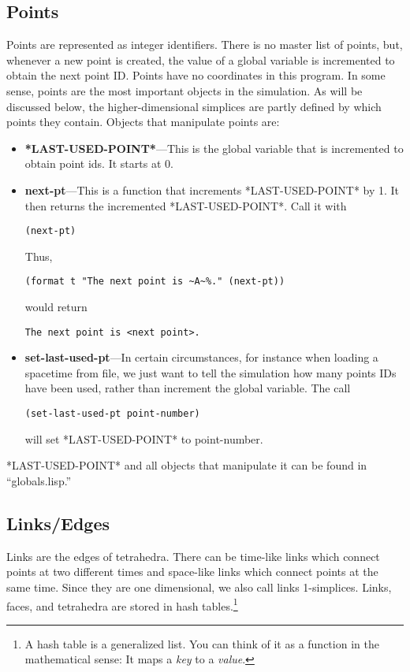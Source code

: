 \message{ !name(programmers_guide.tex)}\documentclass[12pt]{article}
\begin{document}
\subsection{Points}
\label{ss:points}

Points are represented as integer identifiers. There is no master list
of points, but, whenever a new point is created, the value of a global
variable is incremented to obtain the next point ID. Points have no
coordinates in this program. In some sense, points are the most
important objects in the simulation. As will be discussed below, the
higher-dimensional simplices are partly defined by which points they
contain. Objects that manipulate points are:
\begin{itemize}
\item \textbf{*LAST-USED-POINT*}---This is the global variable that is
  incremented to obtain point ids. It starts at 0.
\item \textbf{next-pt}---This is a function that increments
  *LAST-USED-POINT* by 1. It then returns the incremented
  *LAST-USED-POINT*. Call it with
\begin{lstlisting}
(next-pt)
\end{lstlisting}
Thus, 
\begin{lstlisting}
(format t "The next point is ~A~%." (next-pt))
\end{lstlisting}
would return 
\begin{verbatim}
The next point is <next point>.
\end{verbatim}
\item \textbf{set-last-used-pt}---In certain circumstances, for
  instance when loading a spacetime from file, we just want to tell
  the simulation how many points IDs have been used, rather than
  increment the global variable. The call
\begin{lstlisting}
(set-last-used-pt point-number)
\end{lstlisting}
will set *LAST-USED-POINT* to point-number.
\end{itemize}

*LAST-USED-POINT* and all objects that manipulate it can be found in ``globals.lisp.''

\subsection{Links/Edges}
\label{s:links-edges}
Links are the edges of tetrahedra. There can be time-like links which
connect points at two different times and space-like links which
connect points at the same time. Since they are one dimensional, we
also call links 1-simplices. Links, faces, and tetrahedra are stored
in hash tables.\footnote{A hash table is a generalized list. You can
  think of it as a function in the mathematical sense: It maps a
  \textit{key} to a \textit{value}.} 
\end{document}
